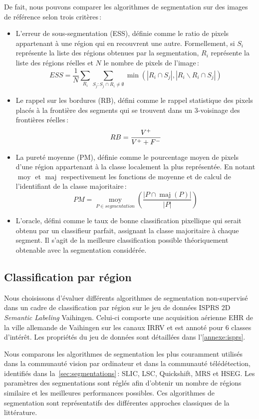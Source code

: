 De fait, nous pouvons comparer les algorithmes de segmentation sur des images de référence selon trois critères\,:
\begin{itemize}
  \item L'erreur de sous-segmentation (ESS), définie comme le ratio de pixels appartenant à une région qui en recouvrent une autre. Formellement, si $S_i$ représente la liste des régions obtenues par la segmentation, $R_i$ représente la liste des régions réelles et $N$ le nombre de pixels de l'image\,:
  $$ESS = \frac{1}{N} \sum_{R_i} \sum_{S_j : S_j \cap R_i \neq \emptyset} \operatorname{min}(\left|R_i \cap S_j\right|, \left|R_i \backslash R_i \cap S_j\right|)$$
  \item Le rappel sur les bordures (RB), défini comme le rappel statistique des pixels placés à la frontière des segments qui se trouvent dans un 3-voisinage des frontières réelles\,:
  $$RB =  \frac{V^+}{V^+ + F^-}$$
  \item La pureté moyenne (PM), définie comme le pourcentage moyen de pixels d'une région appartenant à la classe localement la plus représentée. En notant $\operatorname{moy}$ et $\operatorname{maj}$ respectivement les fonctions de moyenne et de calcul de l'identifiant de la classe majoritaire\,:
  $$PM = \underset{P \in \mathit{segmentation}}{\operatorname{moy}} \left(\frac{\left| P \cap \operatorname{maj}(P)\right|}{\left| P \right|}\right)$$
  \item L'oracle, défini comme le taux de bonne classification pixellique qui serait obtenu par un classifieur parfait, assignant la classe majoritaire à chaque segment. Il s'agit de la meilleure classification possible théoriquement obtenable avec la segmentation considérée.
\end{itemize}

\subsection{Classification par région}
\label{sec:results_region}

Nous choisissons d'évaluer différents algorithmes de segmentation non-supervisé dans un cadre de classification par région sur le jeu de données \gls{ISPRS} 2D \emph{Semantic Labeling} Vaihingen. Celui-ci comporte une acquisition aérienne \gls{EHR} de la ville allemande de Vaihingen sur les canaux \gls{IRRV} et est annoté pour 6 classes d'intérêt. Les propriétés du jeu de données sont détaillées dans l'\cref{annexe:isprs}.

Nous comparons les algorithmes de segmentation les plus couramment utilisés dans la communauté vision par ordinateur et dans la communauté télédétection, identifiés dans la~\cref{sec:segmentations}\,: \gls{SLIC}, \gls{LSC}, Quickshift, \gls{MRS} et \gls{HSEG}. Les paramètres des segmentations sont réglés afin d'obtenir un nombre de régions similaire et les meilleures performances possibles. Ces algorithmes de segmentation sont représentatifs des différentes approches classiques de la littérature.

